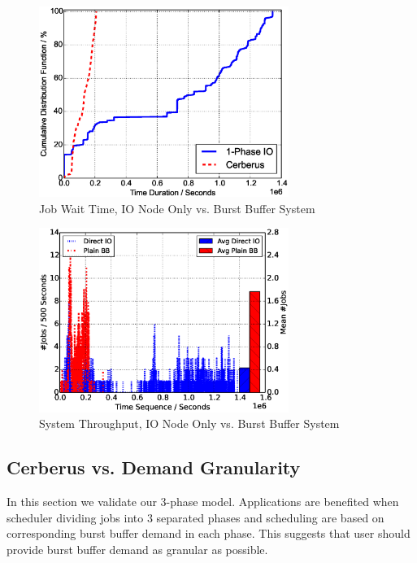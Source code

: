 \begin{figure}[!t]
        \centering
        \includegraphics[width=3.2in]{DrawDirectIOvsBB/1000jobs_direct_vs_bb_wait}
        \caption{Job Wait Time, IO Node Only vs. Burst Buffer System}
        \label{Fig:DirectIOvsBBWait}
\end{figure}

\begin{figure}[!t]
        \centering
        \includegraphics[width=3.2in]{DrawDirectIOvsBB/1000jobs_direct_vs_bb_throughput}
        \caption{System Throughput, IO Node Only vs. Burst Buffer System}
        \label{Fig:DirectIOvsBBThroughput}
\end{figure}


\subsection{Cerberus vs. Demand Granularity}
In this section we validate our 3-phase model.
Applications are benefited when scheduler dividing jobs into 3 separated phases and 
scheduling are based on corresponding burst buffer demand in each phase.
This suggests that user should provide burst buffer demand as granular as possible.

